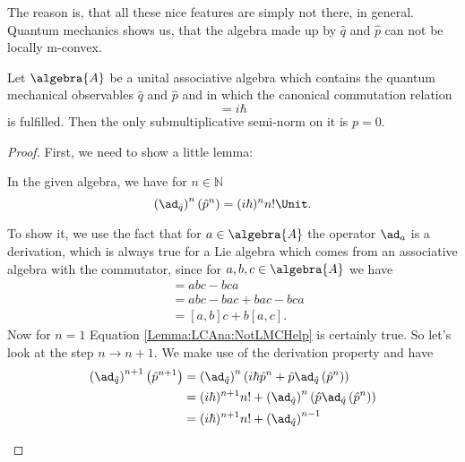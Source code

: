 The reason is, that all these nice features are simply not there, in 
general. Quantum mechanics shows us, that the algebra made up by 
$\hat{q}$ and $\hat{p}$ can not be locally m-convex.
\begin{proposition}
	\label{Prop:LCAna:QMnotLMC}
	Let $\algebra{A}$ be a unital associative algebra which contains the 
	quantum mechanical observables $\hat{q}$ and $\hat{p}$ and in which 
	the canonical commutation relation
	\begin{equation*}
		[\hat{q}, \hat{p}]
		=
		i \hbar
	\end{equation*}
	is fulfilled. Then the only submultiplicative semi-norm on it is 
	$p = 0$.
\end{proposition}
\begin{proof}
	First, we need to show a little lemma:
	\begin{lemma}
		\label{Lemma:LCAna:NotLMCHelp}
		In the given algebra, we have for $n \in \mathbb{N}$
		\begin{equation}
			\label{LCAna:NotLMCHelp}
			\left( \ad_{\hat{q}} \right)^n (\hat{p}^n)
			=
			(i \hbar)^n n! \Unit.
		\end{equation}
	\end{lemma}
	\begin{subproof}
		To show it, we use the fact that for $a \in \algebra{A}$ the 
		operator $\ad_a$ is a derivation, which is always true for a Lie 
		algebra which comes from an associative algebra with the 
		commutator, since for $a, b, c \in \algebra{A}$ we have
		\begin{align*}
			[a, bc]
			& =
			a b c - b c a
			\\
			& =
			a b c - b a c + b a c - b c a
			\\
			& =
			[a, b] c + b [a, c].
		\end{align*}
		Now for $n = 1$ Equation \eqref{Lemma:LCAna:NotLMCHelp} is 
		certainly true. So let's look at the step $n \rightarrow n+1$.
		We make use of the derivation property and have
		\begin{align*}
			\left( \ad_{\hat{q}} \right)^{n+1}
			\left( \hat{p}^{n+1} \right)
			& =
			\left( \ad_{\hat{q}} \right)^{n}
			\left(
				i \hbar \hat{p}^n
				+
				\hat{p} 
				\ad_{\hat{q}} \left( \hat{p}^n \right)
			\right)
			\\
			& =
			(i \hbar)^{n + 1} n!
			+
			\left( \ad_{\hat{q}} \right)^{n}
			\left(
				\hat{p}
				\ad_{\hat{q}} \left( \hat{p}^n \right)
			\right)
			\\
			& =
			(i \hbar)^{n + 1} n!
			+
			\left( \ad_{\hat{q}} \right)^{n-1}

\end{align*}
\end{subproof}
\end{proof}

